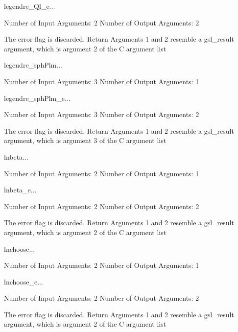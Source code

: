 \begin{funcdesc}{legendre_Ql_e}{...}

    Number of Input  Arguments:  2
    Number of Output Arguments:  2

The error flag is discarded.
Return Arguments 1 and 2 resemble a gsl_result argument,
	which is  argument 2 of the C argument list

\end{funcdesc}

\begin{funcdesc}{legendre_sphPlm}{...}

    Number of Input  Arguments:  3
    Number of Output Arguments:  1
\end{funcdesc}

\begin{funcdesc}{legendre_sphPlm_e}{...}

    Number of Input  Arguments:  3
    Number of Output Arguments:  2

The error flag is discarded.
Return Arguments 1 and 2 resemble a gsl_result argument,
	which is  argument 3 of the C argument list

\end{funcdesc}

\begin{funcdesc}{lnbeta}{...}

    Number of Input  Arguments:  2
    Number of Output Arguments:  1
\end{funcdesc}

\begin{funcdesc}{lnbeta_e}{...}

    Number of Input  Arguments:  2
    Number of Output Arguments:  2

The error flag is discarded.
Return Arguments 1 and 2 resemble a gsl_result argument,
	which is  argument 2 of the C argument list

\end{funcdesc}

\begin{funcdesc}{lnchoose}{...}

    Number of Input  Arguments:  2
    Number of Output Arguments:  1
\end{funcdesc}

\begin{funcdesc}{lnchoose_e}{...}

    Number of Input  Arguments:  2
    Number of Output Arguments:  2

The error flag is discarded.
Return Arguments 1 and 2 resemble a gsl_result argument,
	which is  argument 2 of the C argument list

\end{funcdesc}

